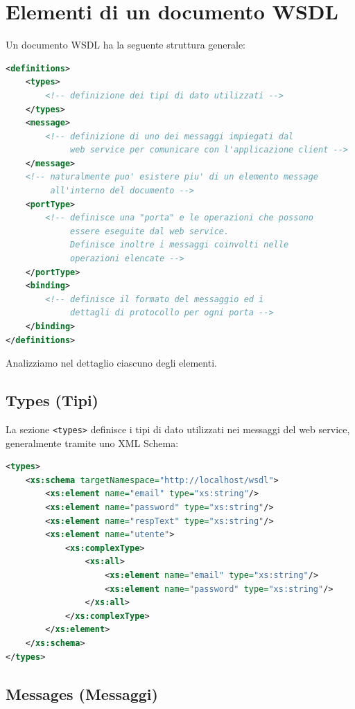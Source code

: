 \section{Elementi di un documento WSDL}

Un documento WSDL ha la seguente struttura generale:

\begin{lstlisting}[language=XML]
<definitions>
    <types>
        <!-- definizione dei tipi di dato utilizzati -->
    </types>
    <message>
        <!-- definizione di uno dei messaggi impiegati dal
             web service per comunicare con l'applicazione client -->
    </message>
    <!-- naturalmente puo' esistere piu' di un elemento message
         all'interno del documento -->
    <portType>
        <!-- definisce una "porta" e le operazioni che possono
             essere eseguite dal web service.
             Definisce inoltre i messaggi coinvolti nelle
             operazioni elencate -->
    </portType>
    <binding>
        <!-- definisce il formato del messaggio ed i
             dettagli di protocollo per ogni porta -->
    </binding>
</definitions>
\end{lstlisting}

Analizziamo nel dettaglio ciascuno degli elementi.

\subsection{Types (Tipi)}

La sezione \texttt{<types>} definisce i tipi di dato utilizzati nei messaggi del web service, generalmente tramite uno XML Schema:

\begin{lstlisting}[language=XML]
<types>
    <xs:schema targetNamespace="http://localhost/wsdl">
        <xs:element name="email" type="xs:string"/>
        <xs:element name="password" type="xs:string"/>
        <xs:element name="respText" type="xs:string"/>
        <xs:element name="utente">
            <xs:complexType>
                <xs:all>
                    <xs:element name="email" type="xs:string"/>
                    <xs:element name="password" type="xs:string"/>
                </xs:all>
            </xs:complexType>
        </xs:element>
    </xs:schema>
</types>
\end{lstlisting}

\subsection{Messages (Messaggi)}

